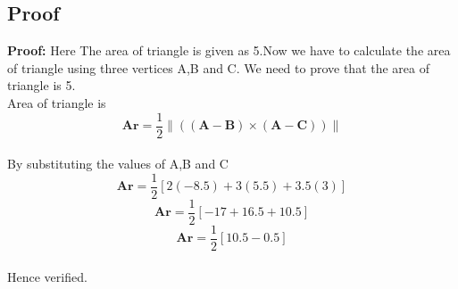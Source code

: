 \documentclass[10pt,a4paper]{report}
\providecommand{\norm}[1]{\left\lVert#1\right\rVert}
\let\vec\mathbf
\begin{document}
\begin{multicols}{2}
\section*{Proof}
\textbf{Proof:}
Here The area of triangle is given as 5.Now we have to calculate the area of triangle using three vertices A,B and C. We need to prove that the area of triangle is 5.
\\Area of triangle is
\begin{equation}
\vec{Ar}=\frac{1}{2}\norm{(\vec{(A-B)}\times\vec{(A-C)})}
\end{equation}
\\By substituting the values of A,B and C\\
\begin{equation}
 \vec{Ar}=\frac{1}{2}[2(-8.5)+3(5.5)+3.5(3)]  
 \end{equation}
 \begin{equation}
 \vec{Ar}=\frac{1}{2}[-17+16.5+10.5]  
 \end{equation}
 \begin{equation}
  \vec{Ar}=\frac{1}{2}[10.5-0.5]  
 \end{equation}
\centering
{}
\vspace{0.25cm}
\\Hence verified.
\end{multicols}
\end{document}
